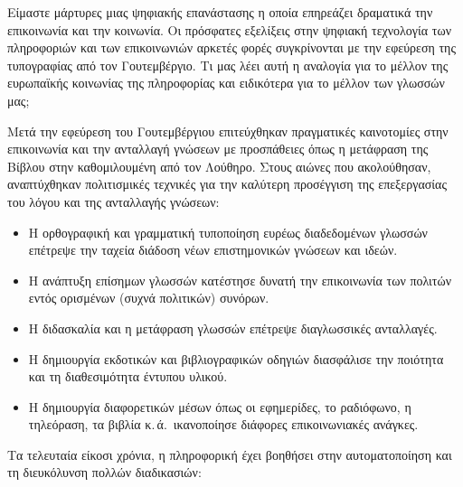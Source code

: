 \begin{multicols}{2}
Είμαστε μάρτυρες μιας ψηφιακής επανάστασης η οποία επηρεάζει δραματικά την επικοινωνία και την κοινωνία. Οι πρόσφατες εξελίξεις στην ψηφιακή τεχνολογία των πληροφοριών και των επικοινωνιών αρκετές φορές συγκρίνονται με την εφεύρεση της τυπογραφίας από τον Γουτεμβέργιο. Τι μας λέει αυτή η αναλογία για το μέλλον της ευρωπαϊκής κοινωνίας της πληροφορίας και ειδικότερα για το μέλλον των γλωσσών μας;


Μετά την εφεύρεση του Γουτεμβέργιου επιτεύχθηκαν πραγματικές καινοτομίες στην επικοινωνία και την ανταλλαγή γνώσεων με προσπάθειες όπως η μετάφραση της Βίβλου στην καθομιλουμένη από τον Λούθηρο. Στους αιώνες που ακολούθησαν, αναπτύχθηκαν πολιτισμικές τεχνικές για την καλύτερη προσέγγιση της επεξεργασίας του λόγου και της ανταλλαγής γνώσεων:

\medskip
\begin{itemize}
\item Η ορθογραφική και γραμματική τυποποίηση ευρέως διαδεδομένων γλωσσών επέτρεψε την ταχεία διάδοση νέων επιστημονικών γνώσεων και ιδεών.
\item Η ανάπτυξη επίσημων γλωσσών κατέστησε δυνατή την επικοινωνία των πολιτών εντός ορισμένων (συχνά πολιτικών) συνόρων.
\item Η διδασκαλία και η μετάφραση γλωσσών επέτρεψε διαγλωσσικές ανταλλαγές.
\item Η δημιουργία εκδοτικών και βιβλιογραφικών οδηγιών διασφάλισε την ποιότητα και τη διαθεσιμότητα έντυπου υλικού.
\item Η δημιουργία διαφορετικών μέσων όπως οι εφημερίδες, το ραδιόφωνο, η τηλεόραση, τα βιβλία κ.\,ά.~ικανοποίησε διάφορες επικοινωνιακές ανάγκες.
\end{itemize}

Τα τελευταία είκοσι χρόνια, η πληροφορική έχει βοηθήσει στην αυτοματοποίηση και τη διευκόλυνση πολλών διαδικασιών:


\end{multicols}
